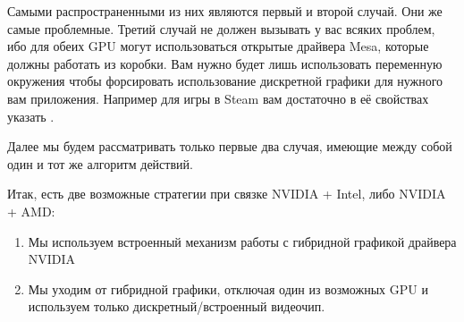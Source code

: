 \documentclass[letterpaper,10pt,russian,openany]{sphinxmanual}
\begin{document}
\sphinxAtStartPar
Самыми распространенными из них являются первый и второй случай. Они же самые проблемные.
Третий случай не должен вызывать у вас всяких проблем, ибо для обеих GPU могут использоваться
открытые драйвера Mesa, которые должны работать из коробки. Вам нужно будет лишь использовать
переменную окружения  чтобы форсировать использование дискретной графики для нужного
вам приложения. Например для игры в Steam вам достаточно в её свойствах указать .

\sphinxAtStartPar
Далее мы будем рассматривать только первые два случая, имеющие между собой один и тот же алгоритм действий.

\sphinxAtStartPar
Итак, есть две возможные стратегии при связке NVIDIA + Intel, либо NVIDIA + AMD:
\begin{enumerate}
%
\item {} 
\sphinxAtStartPar
Мы используем встроенный механизм работы с гибридной графикой драйвера NVIDIA

\item {} 
\sphinxAtStartPar
Мы уходим от гибридной графики, отключая один из возможных GPU и используем только
дискретный/встроенный видеочип.

\end{enumerate}
\end{document}
